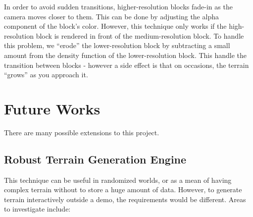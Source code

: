 \documentclass {article}
\begin{document}
In order to avoid sudden transitions, higher-resolution blocks fade-in as the camera moves closer to them. This can be done by adjusting the alpha component of the block's color. However, this technique only works if the high-resolution block is rendered in front of the medium-resolution block. To handle this problem, we ``erode'' the lower-resolution block by subtracting a small amount from the density function of the lower-resolution block. This handle the transition between blocks - however a side effect is that on occasions, the terrain ``grows'' as you approach it.

\section{Future Works}

There are many possible extensions to this project.

\subsection{Robust Terrain Generation Engine}

This technique can be useful in randomized worlds, or as a mean of having complex terrain without to store a huge amount of data. However, to generate terrain interactively outside a demo, the requirements would be different. Areas to investigate include:
\end{document}
